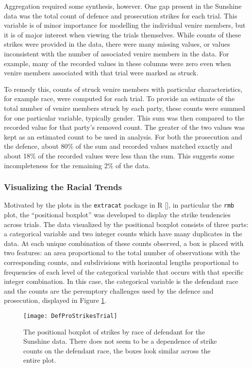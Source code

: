 Aggregation required some synthesis, however. One gap present in the Sunshine data was the total count of defence and prosecution strikes for each trial. This
variable is of minor importance for modelling the individual venire
members, but it is of major interest when viewing the trials
themselves. While counts of these strikes were provided in the data, there were many missing values, or values inconsistent with
the number of associated venire members in the data. For example, many of the recorded values in these columns were zero even when
venire members associated with that trial were marked as struck.

To remedy this,  counts of struck venire members with particular characteristics, for example race, were computed for each trial. To
provide an estimate of the total number of venire members struck by each
party, these counts were summed for one particular
variable, typically gender. This sum was then compared to the recorded value for that party's removed count. The greater of the two
values was kept as an estimated count to be used in analysis. For both the prosecution and the defence, about 80\% of the sum and
recorded values matched exactly and about 18\% of the recorded values were less than the sum. This suggests some incompleteness
for the remaining 2\% of the data.

\subsubsection{Visualizing the Racial Trends} \label{subsec:vistrend}

Motivated by the plots in the \texttt{extracat} package in R
[\cite{extracat}], in particular the \texttt{rmb} plot, the ``positional boxplot'' was developed to display the strike tendencies across
trials. The data visualized by the positional boxplot consists of three parts:
a categorical variable and two integer counts which have many
duplicates in the data. At each unique combination of these counts observed, a box is
placed with two features: an area proportional to the total
number of observations with the corresponding counts, and subdivisions
with horizontal lengths proportional to frequencies of each level of the categorical
variable that occurs with that specific integer combination. In this
case, the categorical variable is the defendant race and the counts
are the peremptory challenges used by the defence and prosecution,
displayed in Figure \ref{fig:trialprodef}.

\begin{figure}[h!]
  \centering
  \texttt{[image: DefProStrikesTrial]}
  \caption[Prosecution and Defence Strikes by Trial]{\footnotesize The positional boxplot of strikes by race of defendant for the
    Sunshine data. There does not seem to be a dependence of strike counts on the defendant race, the boxes look similar across
    the entire plot.}
  \label{fig:trialprodef}
\end{figure}

